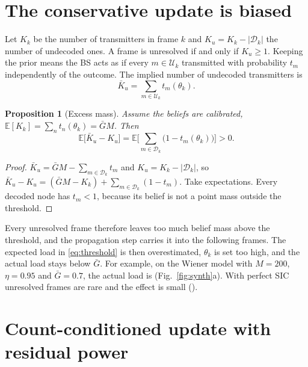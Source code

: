 \documentclass[10pt]{article}
\newtheorem{proposition}{Proposition}
\theoremstyle{remark}
\theoremstyle{definition}
\newcommand{\Gb}{\bar G}
\newcommand{\Dset}{\mathcal D}
\newcommand{\Uset}{\mathcal U}
\begin{document}
\section{The conservative update is biased}
Let $K_k$ be the number of transmitters in frame $k$ and $K_u = K_k-|\Dset_k|$ the number
of undecoded ones. A frame is unresolved if and only if $K_u\ge 1$. Keeping the prior
means the BS acts as if every $m\in\Uset_k$ transmitted with probability $t_m$
independently of the outcome. The implied number of undecoded transmitters is
\[
  \bar K_u = \sum_{m\in\Uset_k} t_m(\theta_k).
\]
\begin{proposition}[Excess mass]
  \label{prop:excess}
  Assume the beliefs are calibrated, $\mathbb E[K_k] = \sum_n t_n(\theta_k) = \Gb M$. Then
  \[
    \mathbb E\big[\bar K_u - K_u\big] = \mathbb E\Big[\sum_{m\in\Dset_k} \big(1-t_m(\theta_k)\big)\Big] > 0 .
  \]
\end{proposition}
\begin{proof}
  $\bar K_u = \Gb M - \sum_{m\in\Dset_k} t_m$ and $K_u = K_k - |\Dset_k|$, so
  $\bar K_u - K_u = (\Gb M - K_k) + \sum_{m\in\Dset_k}(1-t_m)$. Take expectations.
  Every decoded node has $t_m<1$, because its belief is not a point mass outside the threshold.
\end{proof}
Every unresolved frame therefore leaves too much belief mass above the threshold, and
the propagation step carries it into the following frames. The expected load in
\eqref{eq:threshold} is then overestimated, $\theta_k$ is set too high, and the actual load stays
below $\Gb$. For example, on the Wiener model with $M=200$, $\eta=0.95$ and $\Gb=0.7$, the actual load is
\synLoadCons{} (Fig.~\ref{fig:synth}a). With perfect SIC unresolved frames are rare and the effect is small
(\synLoadConsPerfect).

\section{Count-conditioned update with residual power}
\end{document}
